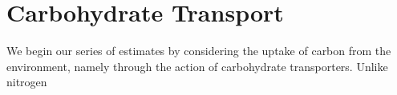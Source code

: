 \section{Carbohydrate Transport}
We begin our series of estimates by considering the uptake of carbon from the
environment, namely through the action of carbohydrate transporters. Unlike
nitrogen 

